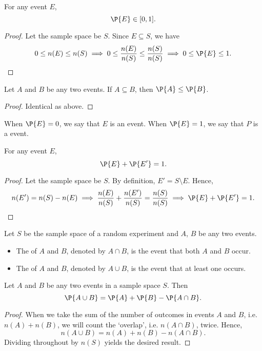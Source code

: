 \begin{proposition}
    For any event $E$, \[\P{E} \in [0, 1].\]
\end{proposition}
\begin{proof}
    Let the sample space be $S$. Since $E \subseteq S$, we have \[0 \leq n(E) \leq n(S) \implies 0 \leq \frac{n(E)}{n(S)} \leq \frac{n(S)}{n(S)} \implies 0 \leq \P{E} \leq 1.\]
\end{proof}

\begin{corollary}
    Let $A$ and $B$ be any two events. If $A \subseteq B$, then $\P{A} \leq \P{B}$.
\end{corollary}
\begin{proof}
    Identical as above.
\end{proof}

\begin{definition}
    When $\P{E} = 0$, we say that $E$ is an  event. When $\P{E} = 1$, we say that $P$ is a  event.
\end{definition}

\begin{proposition}
    For any event $E$, \[\P{E} + \P{E'} = 1.\]
\end{proposition}
\begin{proof}
    Let the sample space be $S$. By definition, $E' = S \setminus E$. Hence, \[n(E') = n(S) - n(E) \implies \frac{n(E)}{n(S)} + \frac{n(E')}{n(S)} = \frac{n(S)}{n(S)} \implies \P{E} + \P{E'} = 1.\]
\end{proof}

\begin{definition}
    Let $S$ be the sample space of a random experiment and $A$, $B$ be any two events.
    \begin{itemize}
        \item The  of $A$ and $B$, denoted by $A \cap B$, is the event that both $A$ and $B$ occur.
        \item The  of $A$ and $B$, denoted by $A \cup B$, is the event that at least one occurs.
    \end{itemize}
\end{definition}

\begin{proposition}
    Let $A$ and $B$ be any two events in a sample space $S$. Then \[\P{A \cup B} = \P{A} + \P{B} - \P{A \cap B}.\]
\end{proposition}
\begin{proof}
    When we take the sum of the number of outcomes in events $A$ and $B$, i.e. $n(A) + n(B)$, we will count the `overlap', i.e. $n(A \cap B)$, twice. Hence, \[n(A \cup B) = n(A) + n(B) - n(A \cap B).\] Dividing throughout by $n(S)$ yields the desired result.
\end{proof}

